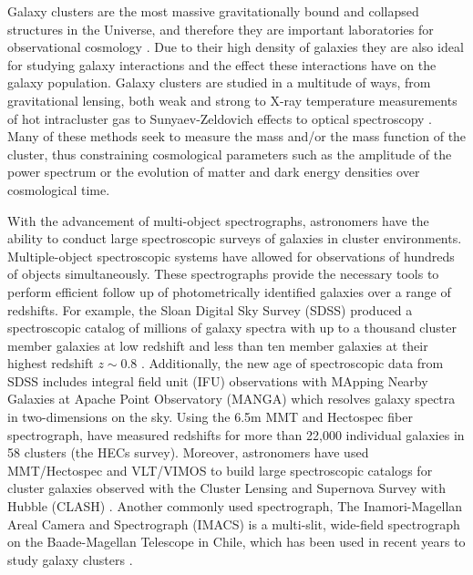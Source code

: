 \documentclass[twocolumn]{aastex6}
\begin{document}
Galaxy clusters are the most massive gravitationally bound and collapsed structures in the Universe, and therefore they are important laboratories for observational cosmology \citep[][]{Diaferio1997, Dressler2004, Voit2005, Jones2009, Vikhlinin2009, Rines2013, Geller2013}.
Due to their high density of galaxies they are also ideal for studying galaxy interactions and the effect these interactions have on the galaxy population.
Galaxy clusters are studied in a multitude of ways, from gravitational lensing, both weak and strong \citep[for example][and references therein]{Kneib2008, Applegate2014, Barreira2015, Gonzalez2015}  to X-ray temperature measurements of hot intracluster gas \citep[][]{Guennou2014, Moffat2014, Girardi2016, Rabitz2017} to Sunyaev-Zeldovich effects \citep[][]{Sunyaev1970, Churazov2015} to optical spectroscopy \citep[e.g.][and references therein]{Rines2003, Rines2013, Hwang2014, Stock2015, Tasca2016, Biviano2016, Dressler2016, Sohn2017}.
Many of these methods seek to measure the mass and/or the mass function of the cluster, thus constraining cosmological parameters such as the amplitude of the power spectrum or the evolution of matter and dark energy densities over cosmological time.

With the advancement of multi-object spectrographs, astronomers have the ability to conduct large spectroscopic surveys of galaxies in cluster environments.
Multiple-object spectroscopic systems have allowed for observations of hundreds of objects simultaneously.
These spectrographs provide the necessary tools to perform efficient follow up of photometrically identified galaxies over a range of redshifts.
For example, the Sloan Digital Sky Survey (SDSS) produced a spectroscopic catalog of millions of galaxy spectra with up to a thousand cluster member galaxies at low redshift and less than ten member galaxies at their highest redshift $z\sim0.8$ \citep[][]{BOSS2012, SDSS2016}.
Additionally, the new age of spectroscopic data from SDSS includes integral field unit (IFU) observations with MApping Nearby Galaxies at Apache Point Observatory (MANGA) which resolves galaxy spectra in two-dimensions on the sky.
Using the 6.5m MMT and Hectospec fiber spectrograph, \citet{Rines2013} have measured redshifts for more than 22,000 individual galaxies in 58 clusters (the HECs survey).
Moreover, astronomers have used MMT/Hectospec and VLT/VIMOS to build large spectroscopic catalogs for cluster galaxies observed with the Cluster Lensing and Supernova Survey with Hubble (CLASH) \citep[e.g.][]{Geller2014, Biviano2013, Rosati2014, Girardi2015}.
Another commonly used spectrograph, The Inamori-Magellan Areal Camera and Spectrograph (IMACS) is a multi-slit, wide-field spectrograph on the Baade-Magellan Telescope in Chile, which has been used in recent years to study galaxy clusters \citep{Dressler2011, Oemler2013}.
\end{document}

